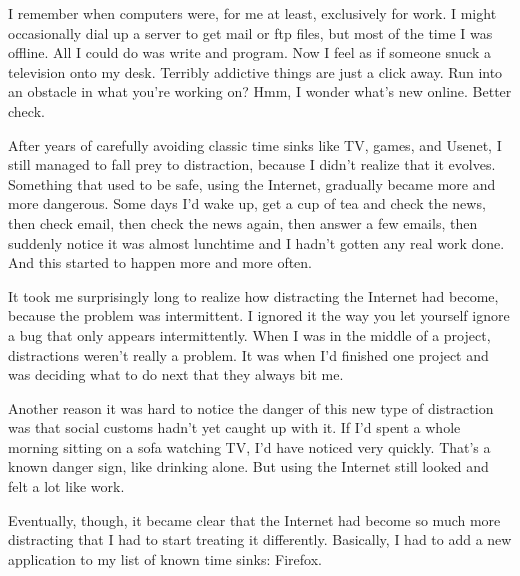 I
                  remember when computers were, for me at least, exclusively for
                  work. I might occasionally dial up a server to get mail or ftp
                  files, but most of the time I was offline. All I could do was
                  write and program. Now I feel as if someone snuck a television
                  onto my desk. Terribly addictive things are just a click away.
                  Run into an obstacle in what you're working on? Hmm, I wonder
                  what's new online. Better check.

After years of
                  carefully avoiding classic time sinks like TV, games, and
                  Usenet, I still managed to fall prey to distraction, because I
                  didn't realize that it evolves. Something that used to be
                  safe, using the Internet, gradually became more and more
                  dangerous. Some days I'd wake up, get a cup of tea and check
                  the news, then check email, then check the news again, then
                  answer a few emails, then suddenly notice it was almost
                  lunchtime and I hadn't gotten any real work done. And this
                  started to happen more and more often.

It took me
                  surprisingly long to realize how distracting the Internet had
                  become, because the problem was intermittent. I ignored it the
                  way you let yourself ignore a bug that only appears
                  intermittently. When I was in the middle of a project,
                  distractions weren't really a problem. It was when I'd
                  finished one project and was deciding what to do next that
                  they always bit me.

Another reason it was hard to
                  notice the danger of this new type of distraction was that
                  social customs hadn't yet caught up with it. If I'd spent a
                  whole morning sitting on a sofa watching TV, I'd have noticed
                  very quickly. That's a known danger sign, like drinking alone.
                  But using the Internet still looked and felt a lot like
                  work.

Eventually, though, it became clear that the
                  Internet had become so much more distracting that I had to
                  start treating it differently. Basically, I had to add a new
                  application to my list of known time sinks: Firefox.


